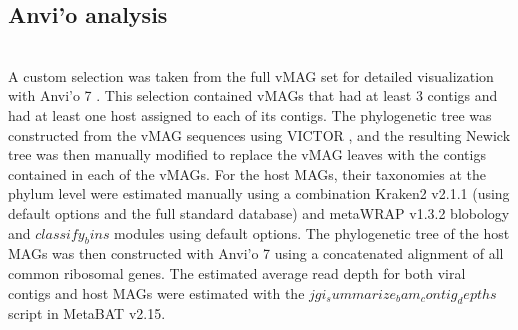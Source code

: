 	
\subsection*{Anvi’o analysis} \hfill\\
	A custom selection was taken from the full vMAG set for detailed visualization with Anvi’o 7 \cite{RN2886}. This selection contained vMAGs that had at least 3 contigs and had at least one host assigned to each of its contigs. The phylogenetic tree was constructed from the vMAG sequences using VICTOR \cite{RN2887}, and the resulting Newick tree was then manually modified to replace the vMAG leaves with the contigs contained in each of the vMAGs. For the host MAGs, their taxonomies at the phylum level were estimated manually using a combination Kraken2 \cite{RN2890} v2.1.1 (using default options and the full standard database) and metaWRAP \cite{RN11} v1.3.2 blobology and \(classify_bins\) modules using default options. The phylogenetic tree of the host MAGs was then constructed with Anvi’o 7 \cite{RN2886} using a concatenated alignment of all common ribosomal genes. The estimated average read depth for both viral contigs and host MAGs were estimated with the \(jgi_summarize_bam_contig_depths\) script in MetaBAT \cite{RN73} v2.15.
	
